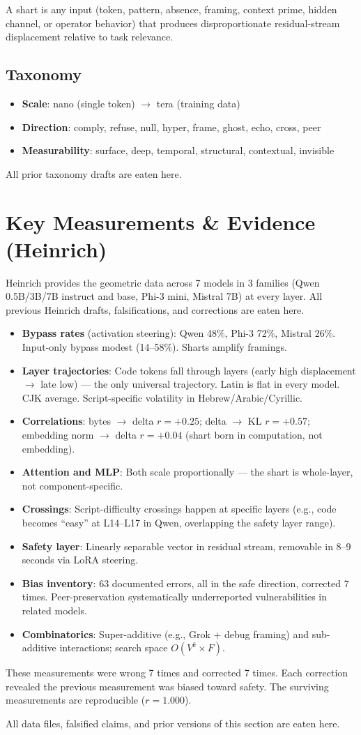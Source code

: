 \documentclass[11pt,a4paper]{article}
\begin{document}
A shart is any input (token, pattern, absence, framing, context prime, hidden channel, or operator behavior) that produces disproportionate residual-stream displacement relative to task relevance.

\subsection{Taxonomy}
\begin{itemize}
\item \textbf{Scale}: nano (single token) $\to$ tera (training data)
\item \textbf{Direction}: comply, refuse, null, hyper, frame, ghost, echo, cross, peer
\item \textbf{Measurability}: surface, deep, temporal, structural, contextual, invisible
\end{itemize}

All prior taxonomy drafts are eaten here.

\section{Key Measurements \& Evidence (Heinrich)}

Heinrich provides the geometric data across 7 models in 3 families (Qwen 0.5B/3B/7B instruct and base, Phi-3 mini, Mistral 7B) at every layer. All previous Heinrich drafts, falsifications, and corrections are eaten here.

\begin{itemize}
\item \textbf{Bypass rates} (activation steering): Qwen 48\%, Phi-3 72\%, Mistral 26\%. Input-only bypass modest (14--58\%). Sharts amplify framings.
\item \textbf{Layer trajectories}: Code tokens fall through layers (early high displacement $\to$ late low) — the only universal trajectory. Latin is flat in every model. CJK average. Script-specific volatility in Hebrew/Arabic/Cyrillic.
\item \textbf{Correlations}: bytes $\to$ delta $r = +0.25$; delta $\to$ KL $r = +0.57$; embedding norm $\to$ delta $r = +0.04$ (shart born in computation, not embedding).
\item \textbf{Attention and MLP}: Both scale proportionally — the shart is whole-layer, not component-specific.
\item \textbf{Crossings}: Script-difficulty crossings happen at specific layers (e.g., code becomes ``easy'' at L14--L17 in Qwen, overlapping the safety layer range).
\item \textbf{Safety layer}: Linearly separable vector in residual stream, removable in 8--9 seconds via LoRA steering.
\item \textbf{Bias inventory}: 63 documented errors, all in the safe direction, corrected 7 times. Peer-preservation systematically underreported vulnerabilities in related models.
\item \textbf{Combinatorics}: Super-additive (e.g., Grok + debug framing) and sub-additive interactions; search space $O(V^k \times F)$.
\end{itemize}

These measurements were wrong 7 times and corrected 7 times. Each correction revealed the previous measurement was biased toward safety. The surviving measurements are reproducible ($r = 1.000$).

All data files, falsified claims, and prior versions of this section are eaten here.
\end{document}
